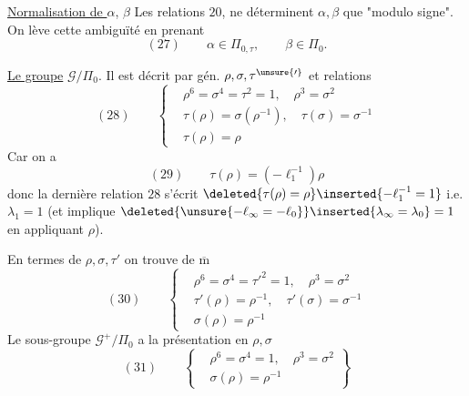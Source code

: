 \uline{Normalisation de $\alpha$}, $\beta$\quad
Les relations $20$, ne déterminent $\alpha,\beta$ que "modulo signe".
On lève cette ambiguïté en prenant
\[
(27)\qquad
\alpha\in\Pi_{0,\tau},\qquad\beta\in\Pi_0.
\]

\uline{Le groupe} $\mathcal G/\Pi_0$.
Il est décrit par gén. $\rho,\sigma,\tau^{\unsure{\prime}}$ et relations 
\[
(28)\qquad
\left\{
\begin{aligned}
&\rho^6=\sigma^4=\tau^2=1,\quad \rho^3=\sigma^2\\
&\tau(\rho)=\sigma(\rho^{-1}),\quad \tau(\sigma)=\sigma^{-1}\\
&\tau(\rho)=\rho
\end{aligned}
\right.
\]
Car on a
\[
(29)\qquad
\tau(\rho)=(-\ell_1^{-1})\rho
\]
donc la dernière relation $28$ s'écrit
$\deleted{\tau(\rho)=\rho}\inserted{-\ell_1^{-1}=1}$
i.e. $\lambda_1=1$
(et implique
$\deleted{\unsure{-\ell_\infty=-\ell_0}}\inserted{\lambda_\infty=\lambda_0}=1$
en appliquant $\rho$).




En termes de $\rho,\sigma,\tau'$ on trouve de $\overline{\mathrm m}$
\[
(30)\qquad
\left\{
\begin{aligned}
&\rho^6=\sigma^4=\tau'^2=1,\quad \rho^3=\sigma^2\\
&\tau'(\rho)=\rho^{-1},\quad\tau'(\sigma)=\sigma^{-1}\\
&\sigma(\rho)=\rho^{-1}
\end{aligned}
\right.
\]
Le sous-groupe $\mathcal G^+/\Pi_0$ a la présentation en $\rho,\sigma$
\[
(31)\qquad
\left\{
\begin{aligned}
&\rho^6=\sigma^4=1,\quad \rho^3=\sigma^2\\
&\sigma(\rho)=\rho^{-1}
\end{aligned}
\right\}
\]

